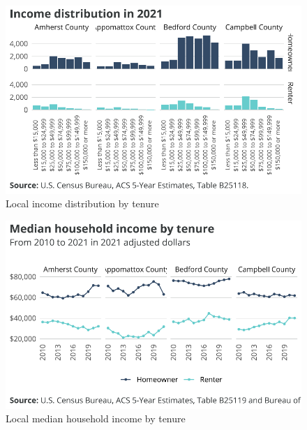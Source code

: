\documentclass[
  letterpaper,
  DIV=11,
  numbers=noendperiod]{scrreprt}
\begin{document}
\begin{figure}[H]

{\centering \includegraphics{./part-3-2_files/figure-pdf/fig-localinc-distribution-1.pdf}

}

\caption{\label{fig-localinc-distribution}Local income distribution by
tenure}

\end{figure}

\begin{figure}[H]

{\centering \includegraphics{./part-3-2_files/figure-pdf/fig-med-inc-1.pdf}

}

\caption{\label{fig-med-inc}Local median household income by tenure}

\end{figure}
\end{document}

